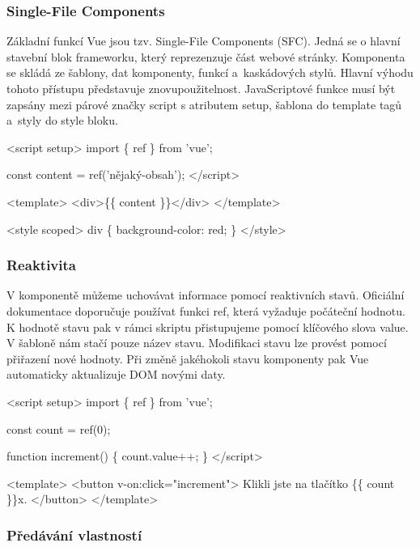 \subsubsection{Single-File Components}

Základní funkcí Vue jsou tzv. Single-File Components (SFC). Jedná se o hlavní stavební blok frameworku, který reprezenzuje část webové stránky. 
Komponenta se skládá ze šablony, dat komponenty, funkcí a~kaskádových stylů. Hlavní výhodu tohoto přístupu představuje znovupoužitelnost. 
JavaScriptové funkce musí být zapsány mezi párové značky script s atributem setup, šablona do template tagů a~styly do style bloku.\cite{vuemacrae,vue}

\begin{prog}
<script setup>
  import \{ ref \} from 'vue';
  
  const content = ref('nějaký-obsah');
</script>
  
<template>
  <div>\{\{ content \}\}</div>
</template>
  
<style scoped>
  div \{
    background-color: red;
  \}
</style>
\end{prog}

\subsubsection{Reaktivita}

V komponentě můžeme uchovávat informace pomocí reaktivních stavů. Oficiální dokumentace doporučuje používat funkci ref, která vyžaduje počáteční hodnotu. 
K hodnotě stavu pak v rámci skriptu přistupujeme pomocí klíčového slova value. V šabloně nám stačí pouze název stavu. 
Modifikaci stavu lze provést pomocí přiřazení nové hodnoty. Při změně jakéhokoli stavu komponenty pak Vue automaticky aktualizuje DOM novými daty.\cite{vue}

\begin{prog}
<script setup>
  import \{ ref \} from 'vue';
  
  const count = ref(0);

  function increment() \{
    count.value++;
  \}
</script>
  
<template>
  <button v-on:click="increment">
    Klikli jste na tlačítko \{\{ count \}\}x.
  </button>
</template>
\end{prog}

\subsubsection{Předávání vlastností}

